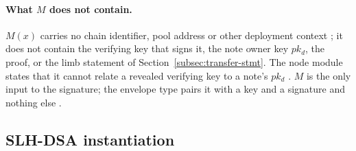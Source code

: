 \paragraph{What $M$ does not contain.} $M(x)$ carries no chain identifier,
pool address or other deployment context ; it does not contain
the verifying key that signs it, the note owner key $pk_d$, the proof, or the
limb statement of Section~\ref{subsec:transfer-stmt}. The node module states
that it cannot relate a revealed verifying key to a note's $pk_d$
 . $M$ is the only input to the
signature; the envelope type pairs it with a key and a signature and nothing
else .

\subsection{SLH-DSA instantiation}
\label{subsec:app-slh}

